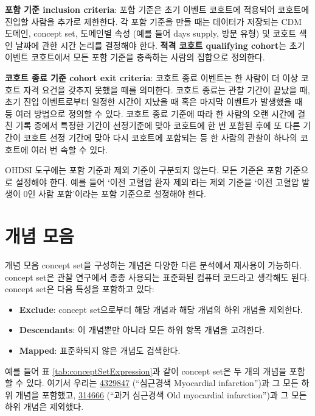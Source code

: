 \documentclass[10.5pt]{book}
\providecommand{\tightlist}{%
  \setlength{\itemsep}{0pt}\setlength{\parskip}{0pt}}
\theoremstyle{definition}
\theoremstyle{definition}
\theoremstyle{definition}
\theoremstyle{remark}
\let\BeginKnitrBlock\begin \let\EndKnitrBlock\end
\begin{document}
\textbf{포함 기준 inclusion criteria}: 포함 기준은 초기 이벤트 코호트에
적용되어 코호트에 진입할 사람을 추가로 제한한다. 각 포함 기준을 만들
때는 데이터가 저장되는 CDM 도메인, concept set, 도메인별 속성 (예를 들어
days supply, 방문 유형) 및 코호트 색인 날짜에 관한 시간 논리를 결정해야
한다. \textbf{적격 코호트 qualifying cohort}는 초기 이벤트 코호트에서
모든 포함 기준을 충족하는 사람의 집합으로 정의한다.

\textbf{코호트 종료 기준 cohort exit criteria}: 코호트 종료 이벤트는 한
사람이 더 이상 코호트 자격 요건을 갖추지 못했을 때를 의미한다. 코호트
종료는 관찰 기간이 끝났을 때, 초기 진입 이벤트로부터 일정한 시간이
지났을 때 혹은 마지막 이벤트가 발생했을 때 등 여러 방법으로 정의할 수
있다. 코호트 종료 기준에 따라 한 사람의 오랜 시간에 걸친 기록 중에서
특정한 기간이 선정기준에 맞아 코호트에 한 번 포함된 후에 또 다른 기간이
코호트 선정 기간에 맞아 다시 코호트에 포함되는 등 한 사람의 관찰이
하나의 코호트에 여러 번 속할 수 있다.

\BeginKnitrBlock{rmdimportant}
OHDSI 도구에는 포함 기준과 제외 기준이 구분되지 않는다. 모든 기준은 포함
기준으로 설정해야 한다. 예를 들어 `이전 고혈압 환자 제외'라는 제외
기준을 `이전 고혈압 발생이 0인 사람 포함'이라는 포함 기준으로 설정해야
한다.
\EndKnitrBlock{rmdimportant}

\section{개념 모음}\label{conceptSets}


개념 모음 concept set을 구성하는 개념은 다양한 다른 분석에서 재사용이
가능하다. concept set은 관찰 연구에서 종종 사용되는 표준화된 컴퓨터
코드라고 생각해도 된다. concept set은 다음 특성을 포함하고 있다:

\begin{itemize}
\tightlist
\item
  \textbf{Exclude}: concept set으로부터 해당 개념과 해당 개념의 하위
  개념을 제외한다.
\item
  \textbf{Descendants}: 이 개념뿐만 아니라 모든 하위 항목 개념을
  고려한다.
\item
  \textbf{Mapped}: 표준화되지 않은 개념도 검색한다.
\end{itemize}

예를 들어 표 \ref{tab:conceptSetExpression}과 같이 concept set은 두 개의
개념을 포함할 수 있다. 여기서 우리는
\href{http://athena.ohdsi.org/search-terms/terms/4329847}{4329847}
(``심근경색 Myocardial infarction'')과 그 모든 하위 개념을 포함했고,
\href{http://athena.ohdsi.org/search-terms/terms/314666}{314666} (``과거
심근경색 Old myocardial infarction'')과 그 모든 하위 개념은 제외했다.
\end{document}
